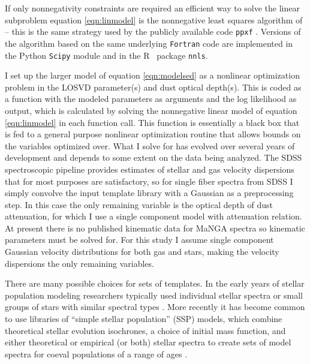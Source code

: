 \documentclass[modern]{aastex62}
\newcommand{\R}{{\normalfont\textsf{R}}{}}
\begin{document}
If only nonnegativity constraints are required an efficient way to solve the linear subproblem equation \ref{eqn:linmodel} is the nonnegative least squares algorithm of \citet{doi:10.1137/1.9781611971217} -- this is the same strategy used by the publicly available code \texttt{ppxf} \citep{2004PASP..116..138C, 2017MNRAS.466..798C}. Versions of the algorithm based on the same underlying \texttt{Fortran} code are implemented in the Python \texttt{Scipy} module and in the \R~ package \texttt{nnls}.

I set up the larger model of equation \ref{eqn:modelsed} as a nonlinear optimization problem in the LOSVD parameter(s) and dust optical depth(s). This is coded as a function with the modeled parameters as arguments and the log likelihood as output, which is calculated by solving the nonnegative linear model of equation \ref{eqn:linmodel} in each function call. This function is essentially a black box that is fed to a general purpose nonlinear optimization routine that allows bounds on the variables optimized over. What I solve for has evolved over several years of development and depends to some extent on the data being analyzed. The SDSS spectroscopic pipeline provides estimates of stellar and gas velocity dispersions that for most purposes are satisfactory, so for single fiber spectra from SDSS I simply convolve the input template library with a Gaussian as a preprocessing step. In this case the only remaining variable is the optical depth of dust attenuation, for which I use a single component model with \citet{2001PASP..113.1449C} attenuation relation. At present there is no published kinematic data for MaNGA spectra so kinematic parameters must be solved for. For this study I assume single component Gaussian velocity distributions for both gas and stars, making the velocity dispersions the only remaining variables.

There are many possible choices for sets of templates. In the early years of stellar population modeling researchers typically used individual stellar spectra or small groups of stars with similar spectral types \citep{1971ApJS...22..445S, 1972A&A....20..361F, 1974A&A....33..177J, 1976ApJ...206..370O, 1976ApJ...209..716W, 1976ApJ...210...33T, 1977ApJS...35..397P}. More recently it has become common to use libraries of ``simple stellar population'' (SSP) models, which combine theoretical stellar evolution isochrones, a choice of initial mass function, and either theoretical or empirical (or both) stellar spectra to create sets of model spectra for coeval populations of a range of ages \citep{2003MNRAS.344.1000B, 2005MNRAS.362..799M, 2010MNRAS.404.1639V, 2012MNRAS.419..479E}.
\end{document}
